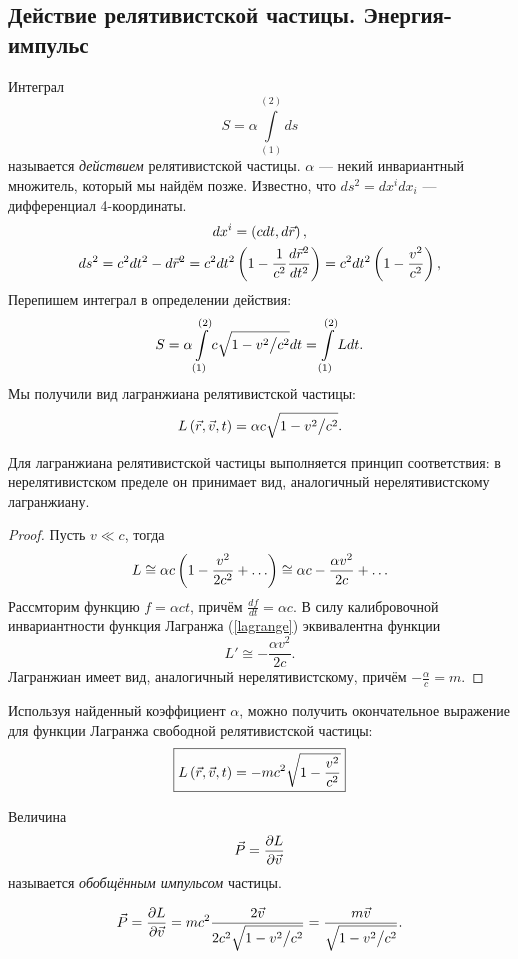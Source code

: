 \subsection{Действие релятивистской частицы. Энергия-импульс}
    Интеграл
    \[
        S = \alpha \int\limits_{(1)}^{(2)} ds
    \]
    называется \textit{действием} релятивистской частицы. $\alpha$ --- некий инвариантный множитель, который мы найдём позже.
    Известно, что $ds^2 = dx^idx_i$ --- дифференциал 4-координаты.
    \begin{gather*}
        dx^i = \left({cdt, d\vec{r}}\right), \\
        ds^2 = c^2dt^2 - d\vec{r}^2 = c^2dt^2\left({1 - \frac{1}{c^2}\frac{d\vec{r}^2}{dt^2}}\right) =
        c^2dt^2\left({1 - \frac{v^2}{c^2}}\right), \\
    \end{gather*}
    Перепишем интеграл в определении действия:
    \[
        S = \alpha\int\limits_{(1)}^{(2)}c\sqrt{1 - v^2 \big/ c^2} dt = \int\limits_{(1)}^{(2)} Ldt.
    \]
    Мы получили вид лагранжиана релятивистской частицы:
    \[
        L\left({\vec{r}, \vec{v}, t}\right) = \alpha c\sqrt{1 - v^2 \big/ c^2}.
    \]
    \begin{prop}
        Для лагранжиана релятивистской частицы выполняется принцип соответствия: в нерелятивистском пределе он принимает вид,
        аналогичный нерелятивистскому лагранжиану.
    \end{prop}
    \begin{proof}
        Пусть $v \ll c$, тогда
        \begin{equation}
            L \cong \alpha c\left({1 - \frac{v^2}{2c^2} + \ldots}\right) \cong \alpha c - \frac{\alpha v^2}{2c} + \ldots
            \label{lagrange}
        \end{equation}
        Рассмторим функцию $f = \alpha ct$, причём $\frac{df}{dt} = \alpha c$. В силу калибровочной инвариантности функция Лагранжа (\ref{lagrange})
        эквивалентна функции
        \[
            L' \cong -\frac{\alpha v^2}{2c}.
        \]
        Лагранжиан имеет вид, аналогичный нерелятивистскому, причём $\displaystyle -\frac{\alpha}{c} = m$.
    \end{proof}
    Используя найденный коэффициент $\alpha$, можно получить окончательное выражение для функции Лагранжа
    свободной релятивистской частицы:
    \[
        \boxed{L\left({\vec{r}, \vec{v}, t}\right) = -mc^2\sqrt{1 - \frac{v^2}{c^2}}}
    \]

    \begin{Def} Величина
        \[
            \vec{P} = \frac{\partial L}{\partial\vec{v}}
        \]
        называется \textit{обобщённым импульсом} частицы.
    \end{Def}
    \[
        \vec{P} = \frac{\partial L}{\partial\vec{v}} = mc^2\frac{2\vec{v}}{2c^2\sqrt{1 - v^2 \big/ c^2}} = \frac{m\vec{v}}{\sqrt{1 - v^2 \big/ c^2}}.
    \]

